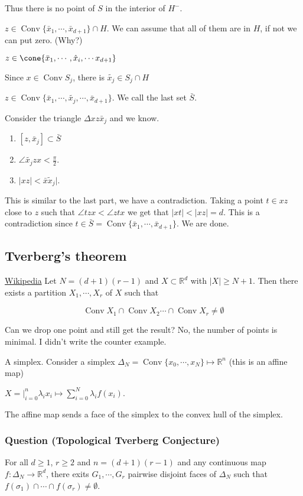 \documentclass[11pt]{article}
\def\R{\mathbb{R}}
\def\conv{\operatorname{Conv}}
\begin{document}
Thus there is no point of \(S\) in the interior of \(H^{-}\).

\(z \in \conv\{\bar{x}_1, \cdots, \bar{x}_{d+1}\} \cap H\). We can assume that
all of them are in \(H\), if not we can put zero. (Why?)

\(z \in \cone\{\bar{x}_1, \cdots, \hat{x}_i, \cdots x_{d+1}\}\)

Since \(x\in \conv S_j\), there is \(\tilde{x_j} \in S_j \cap H\) 

\(z \in \conv\{\bar{x}_1, \cdots, \tilde{x_j}, \cdots, \bar{x}_{d+1}\}\). We
call the last set \(\bar{S}\).

Consider the triangle \(\Delta xz\bar{x}_j\) and we know.
\begin{enumerate}
\item \([z, \bar{x}_j] \subset \bar{S}\)
\item \(\angle \tilde{x_j}zx < \frac{\pi}{2}\).
\item \(\vert xz\vert < \bar x \tilde{x}_j\vert\).
\end{enumerate}

This is similar to the last part, we have a contradiction. Taking a point \(t
    \in xz\) close to \(z\) such that \(\angle tzx < \angle ztx\) we get that \(\vert
    xt \vert < \vert xz\vert = d\). This is a contradiction since \(t \in \bar{S}
    = \conv\{\bar{x}_1, \cdots, \bar{x}_{d+1}\}\). We are done.
\subsection{Tverberg's theorem}
\label{sec:org5566c44}
\href{https://en.wikipedia.org/wiki/Tverberg\%27s\_theorem}{Wikipedia} Let \(N=(d+1)(r-1)\) and \(X \subset \R^d\) with \(\vert X \vert \ge
   N+1\). Then there exists a partition \(X_1, \cdots, X_r\) of \(X\) such that

$$\conv X_1 \cap \conv X_2 \cdots \cap \conv X_r \neq \emptyset$$

Can we drop one point and still get the result? No, the number of points is
minimal. I didn't write the counter example.

A simplex. Consider a simplex \(\Delta_N = \conv \{x_0, \cdots, x_N\} \mapsto
   \R^n\) (this is an affine map)

\(X = \vert_{i=0}^n \lambda_i x_i \mapsto \sum_{i=0}^N \lambda_i f(x_i)\).

The affine map sends a face of the simplex to the convex hull of the
simplex.
\subsubsection{Question (Topological Tverberg Conjecture)}
\label{sec:orgca96a28}
For all \(d \ge 1\), \(r \ge 2\) and \(n=(d+1)(r-1)\) and any continuous map
\(f\colon \Delta_N \rightarrow \R^d\), there exits \(G_1, \cdots, G_r\) pairwise
disjoint faces of \(\Delta_N\) such that \(f(\sigma_1) \cap \cdots \cap
    f(\sigma_r) \neq \emptyset\).
\end{document}
